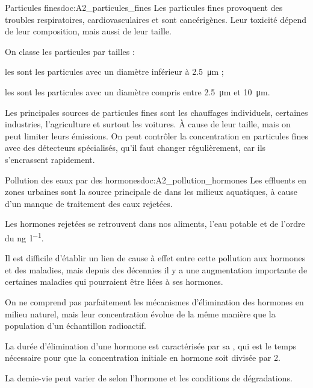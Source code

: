 \begin{doc}{Particules fines}{doc:A2_particules_fines}
  Les particules fines provoquent des troubles respiratoires, cardiovasculaires et sont cancérigènes.
  Leur toxicité dépend de leur composition, mais aussi de leur taille. 

  \begin{importants}
    On classe les particules par tailles :
    \begin{listePoints}
      \item les  sont les particules avec un diamètre inférieur à \qty{2,5}{\micro\m} ;
      \item les  sont les particules avec un diamètre compris entre \qty{2,5}{\micro\m} et \qty{10}{\micro\m}.
    \end{listePoints}
  \end{importants}

  Les principales sources de particules fines sont les chauffages individuels, certaines industries, l'agriculture et surtout les voitures.
  À cause de leur taille,  mais on peut limiter leurs émissions.
  On peut contrôler la concentration en particules fines avec des détecteurs spécialisés, qu'il faut changer régulièrement, car ils s'encrassent rapidement.
\end{doc}

\begin{doc}{Pollution des eaux par des hormones}{doc:A2_pollution_hormones}
  Les effluents en zones urbaines sont la source principale de  dans les milieux aquatiques, à cause d'un manque de traitement des eaux rejetées.

  \begin{importants}
    Les hormones rejetées se retrouvent dans nos aliments, l'eau potable et  de l'ordre du \unit{\nano\g\per\litre}.
  \end{importants}
  Il est difficile d'établir un lien de cause à effet entre cette pollution aux hormones et des maladies, mais depuis des décennies il y a une augmentation importante de certaines maladies qui pourraient être liées à ses hormones.

  On ne comprend pas parfaitement les mécanismes d'élimination des hormones en milieu naturel, mais leur concentration évolue de la même manière que la population d'un échantillon radioactif.
  \begin{importants}
    La durée d'élimination d'une hormone est caractérisée par sa , qui est le temps nécessaire pour que la concentration initiale en hormone soit divisée par 2.
  \end{importants}
  
  La demie-vie peut varier de  selon l'hormone et les conditions de dégradations.
\end{doc}

